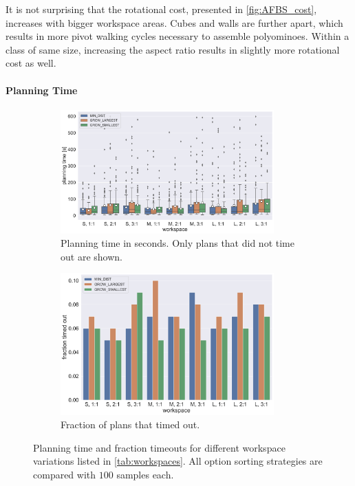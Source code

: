 It is not surprising that the rotational cost, presented in \autoref{fig:AFBS_cost}, increases with bigger workspace areas.
Cubes and walls are further apart, which results in more pivot walking cycles necessary to assemble polyominoes.
Within a class of same size, increasing the aspect ratio results in slightly more rotational cost as well.

\paragraph{Planning Time} 

\begin{figure}
	\centering
	\begin{subfigure}[b]{\textwidth}
		\centering
		\includegraphics[width=0.9\textwidth]{figures/plots/AFBS_time.pdf}
		\caption{Planning time in seconds. Only plans that did not time out are shown.}
		\label{fig:AFBS_time}
	\end{subfigure}
	
	\begin{subfigure}[b]{\textwidth}
		\centering
		\includegraphics[width=0.9\textwidth]{figures/plots/AFBS_timeout.pdf}
		\caption{Fraction of plans that timed out.}
		\label{fig:AFBS_timeout}
	\end{subfigure}
	\caption[Planning time and fraction of timeouts for workspace variations]{Planning time and fraction timeouts for different workspace variations listed in \autoref{tab:workspaces}. All option sorting strategies are compared with $100$ samples each.}
	\label{fig:AFBS_timestats}
\end{figure}

